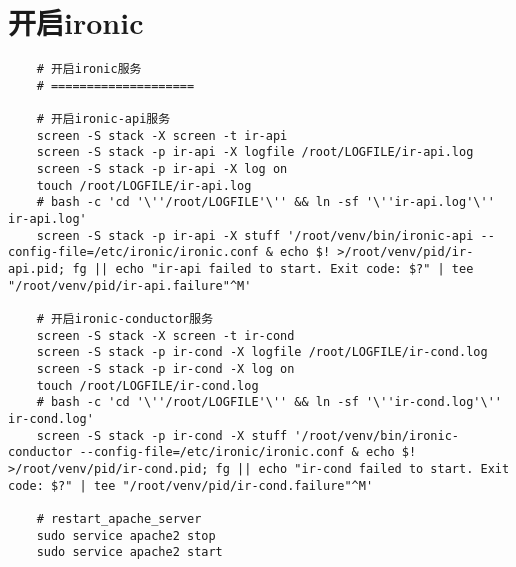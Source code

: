 \documentclass[a4paper,left=2.5cm,right=2.5cm,11pt]{article}
\begin{document}
\section{开启ironic}
	\begin{lstlisting}
	# 开启ironic服务
	# ====================

	# 开启ironic-api服务
	screen -S stack -X screen -t ir-api
	screen -S stack -p ir-api -X logfile /root/LOGFILE/ir-api.log
    screen -S stack -p ir-api -X log on
	touch /root/LOGFILE/ir-api.log
    # bash -c 'cd '\''/root/LOGFILE'\'' && ln -sf '\''ir-api.log'\'' ir-api.log'
	screen -S stack -p ir-api -X stuff '/root/venv/bin/ironic-api --config-file=/etc/ironic/ironic.conf & echo $! >/root/venv/pid/ir-api.pid; fg || echo "ir-api failed to start. Exit code: $?" | tee "/root/venv/pid/ir-api.failure"^M'

	# 开启ironic-conductor服务
	screen -S stack -X screen -t ir-cond
	screen -S stack -p ir-cond -X logfile /root/LOGFILE/ir-cond.log
    screen -S stack -p ir-cond -X log on
	touch /root/LOGFILE/ir-cond.log
    # bash -c 'cd '\''/root/LOGFILE'\'' && ln -sf '\''ir-cond.log'\'' ir-cond.log'
	screen -S stack -p ir-cond -X stuff '/root/venv/bin/ironic-conductor --config-file=/etc/ironic/ironic.conf & echo $! >/root/venv/pid/ir-cond.pid; fg || echo "ir-cond failed to start. Exit code: $?" | tee "/root/venv/pid/ir-cond.failure"^M'

	# restart_apache_server
	sudo service apache2 stop
	sudo service apache2 start
	\end{lstlisting}
\end{document}
